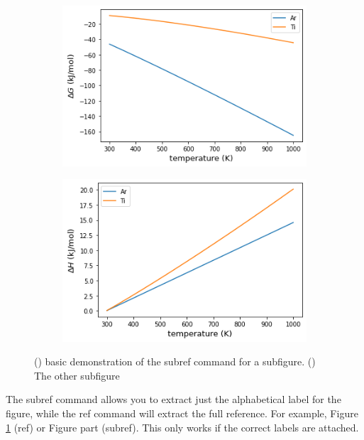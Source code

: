 \begin{figure}[H]
    \centering
    \begin{subfigure}{0.45\textwidth}
        \centering
        \includegraphics[width=\textwidth,keepaspectratio]{figures/DeltaG.png}
        \caption{}
        \label{fig:example1}
    \end{subfigure}
    \begin{subfigure}{0.45\textwidth}
        \centering
        \includegraphics[width=\textwidth,keepaspectratio]{figures/DeltaH.png}
        \caption{}
        \label{fig:example2}
    \end{subfigure}
    \caption{
    () basic demonstration of the subref command for a subfigure.
    () The other subfigure
    }
    \label{fig:example-main}
\end{figure}
The subref command allows you to extract just the alphabetical label for the figure, while the ref command will extract the full reference.
For example, Figure \ref{fig:example1} (ref) or Figure part  (subref).
This only works if the correct labels are attached.
%
